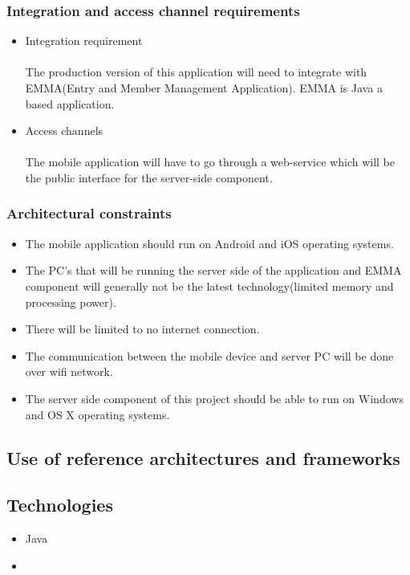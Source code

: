 \documentclass[10pt,a4paper]{article}
\begin{document}
\subsubsection{Integration and access channel requirements}
\begin{itemize}
\item Integration requirement
\paragraph{}
The production version of this application will need to integrate with EMMA(Entry and Member Management Application). EMMA is Java a based application.
\item Access channels
\paragraph{}
The mobile application will have to go through a web-service which will be the public interface for the server-side component. 
\end{itemize}
\subsubsection{Architectural constraints}
\begin{itemize}
\item The mobile application should run on Android and iOS operating systems.
\item The PC's that will be running the server side of the application and EMMA component will generally not be the latest technology(limited memory and processing power).
\item There will be limited to no internet connection.
\item The communication between the mobile device and server PC will be done over wifi network.
\item The server side component of this project should be able to run on Windows and OS X operating systems.
\end{itemize}
\subsection{Use of reference architectures and frameworks}
\subsection{Technologies}
\begin{itemize}
\item Java
\item
\end{itemize}
\end{document}
